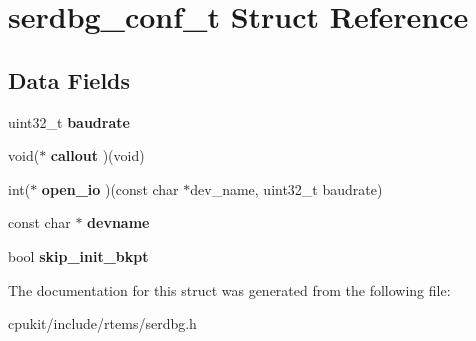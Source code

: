 \hypertarget{structserdbg__conf__t}{}\section{serdbg\+\_\+conf\+\_\+t Struct Reference}
\label{structserdbg__conf__t}
\subsection*{Data Fields}
\begin{DoxyCompactItemize}
\item 
\mbox{\label{structserdbg__conf__t_a9c1faba0f1e4116f4fb54a6c5bf2853e}} 
uint32\+\_\+t {\bfseries baudrate}
\item 
\mbox{\label{structserdbg__conf__t_a60d5f6f5419449b5968a87d4e3c5f1c2}} 
void($\ast$ {\bfseries callout} )(void)
\item 
\mbox{\label{structserdbg__conf__t_ac01dc4f66b2fcf180cbca40d4535d495}} 
int($\ast$ {\bfseries open\+\_\+io} )(const char $\ast$dev\+\_\+name, uint32\+\_\+t baudrate)
\item 
\mbox{\label{structserdbg__conf__t_ac7ba818a472879eaa33bc47a48bfd5ea}} 
const char $\ast$ {\bfseries devname}
\item 
\mbox{\label{structserdbg__conf__t_a41d2a1e64239684e66f9f3b147188f8f}} 
bool {\bfseries skip\+\_\+init\+\_\+bkpt}
\end{DoxyCompactItemize}


The documentation for this struct was generated from the following file\+:\begin{DoxyCompactItemize}
\item 
cpukit/include/rtems/serdbg.\+h\end{DoxyCompactItemize}
